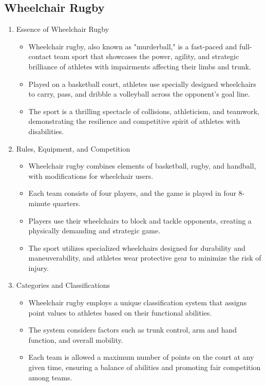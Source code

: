 \subsection{Wheelchair Rugby}

\begin{enumerate}

\item Essence of Wheelchair Rugby
    \begin{itemize}
    \item Wheelchair rugby, also known as "murderball," is a fast-paced and full-contact team sport that showcases the power, agility, and strategic brilliance of athletes with impairments affecting their limbs and trunk. 
    \item Played on a basketball court, athletes use specially designed wheelchairs to carry, pass, and dribble a volleyball across the opponent's goal line. 
    \item The sport is a thrilling spectacle of collisions, athleticism, and teamwork, demonstrating the resilience and competitive spirit of athletes with disabilities.
    \end{itemize}

\item Rules, Equipment, and Competition
    \begin{itemize}
    \item Wheelchair rugby combines elements of basketball, rugby, and handball, with modifications for wheelchair users. 
    \item Each team consists of four players, and the game is played in four 8-minute quarters. 
    \item Players use their wheelchairs to block and tackle opponents, creating a physically demanding and strategic game. 
    \item The sport utilizes specialized wheelchairs designed for durability and maneuverability, and athletes wear protective gear to minimize the risk of injury.
    \end{itemize}

\item Categories and Classifications
    \begin{itemize}
    \item Wheelchair rugby employs a unique classification system that assigns point values to athletes based on their functional abilities. 
    \item The system considers factors such as trunk control, arm and hand function, and overall mobility. 
    \item Each team is allowed a maximum number of points on the court at any given time, ensuring a balance of abilities and promoting fair competition among teams.
    \end{itemize}

\end{enumerate}